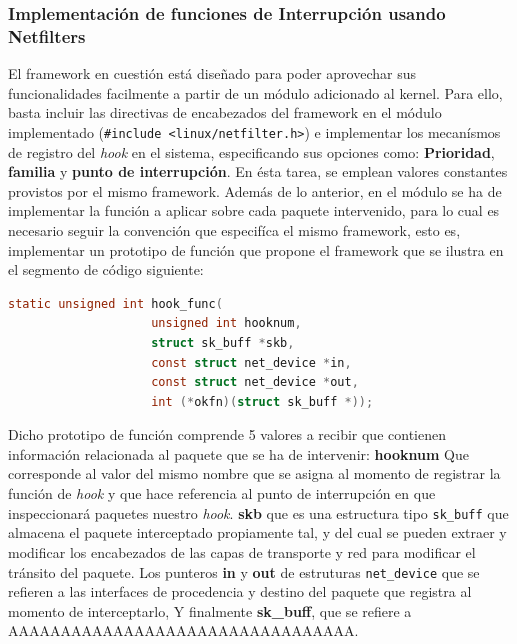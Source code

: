 \subsubsection{Implementación de funciones de Interrupción usando Netfilters}

El framework en cuestión está diseñado para poder aprovechar sus funcionalidades facilmente a partir de un módulo adicionado al kernel. Para ello, basta incluir las directivas de encabezados del framework en el módulo implementado (\verb=#include <linux/netfilter.h>=) e implementar los mecanísmos de registro del \emph{hook} en el sistema, especificando sus opciones como: \textbf{Prioridad}, \textbf{familia} y \textbf{punto de interrupción}. En ésta tarea, se emplean valores constantes provistos por el mismo framework. Además de lo anterior, en el módulo se ha de implementar la función a aplicar sobre cada paquete intervenido, para lo cual es necesario seguir la convención que especifíca el mismo framework, esto es, implementar un prototipo de función que propone el framework que se ilustra en el segmento de código siguiente:

\begin{lstlisting}[language=C, frame=single, backgroundcolor=\color{mygray}, captionpos=b, caption=ESO]
static unsigned int hook_func(
            		unsigned int hooknum,
            		struct sk_buff *skb, 
            		const struct net_device *in, 
            		const struct net_device *out, 
            		int (*okfn)(struct sk_buff *));
\end{lstlisting}

Dicho prototipo de función comprende 5 valores a recibir que contienen información relacionada al paquete que se ha de intervenir: \textbf{hooknum} Que corresponde al valor del mismo nombre que se asigna al momento de registrar la función de \emph{hook} y que hace referencia al punto de interrupción en que inspeccionará paquetes nuestro \emph{hook}. \textbf{skb} que es una estructura tipo \verb=sk_buff= que almacena el paquete interceptado propiamente tal, y del cual se pueden extraer y modificar los encabezados de las capas de transporte y red para modificar el tránsito del paquete. Los punteros \textbf{in} y \textbf{out} de estruturas \verb=net_device= que se refieren a las interfaces de procedencia y destino del paquete que registra al momento de interceptarlo, Y finalmente \textbf{sk\_buff}, que se refiere a AAAAAAAAAAAAAAAAAAAAAAAAAAAAAAAAA.

